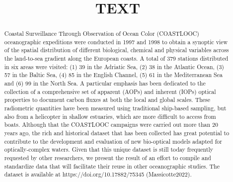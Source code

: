 \documentclass[essd, manuscript]{copernicus}
\begin{document}
\title{TEXT}



\Author[]{}{}
\Author[]{}{}
\Author[]{}{}









\received{}
\pubdiscuss{} %
\revised{}
\accepted{}
\published{}




\maketitle

\begin{abstract}
    Coastal Surveillance Through Observation of Ocean Color (COASTLOOC) oceanographic expeditions were conducted in 1997 and 1998 to obtain a synoptic view of the spatial distribution of different biological, chemical and physical variables across the land-to-sea gradient along the European coasts. A total of 379 stations distributed in six areas were visited: (1) 39 in the Adriatic Sea, (2) 38 in the Atlantic Ocean, (3) 57 in the Baltic Sea, (4) 85 in the English Channel, (5) 61 in the Mediterranean Sea and (6) 99 in the North Sea. A particular emphasis has been dedicated to the collection of a comprehensive set of apparent (AOPs) and inherent (IOPs) optical properties to document carbon fluxes at both the local and global scales. These radiometric quantities have been measured using traditional ship-based sampling, but also from a helicopter in shallow estuaries, which are more difficult to access from boats. Although that the COASTLOOC campaigns were carried out more than 20 years ago, the rich and historical dataset that has been collected has great potential to contribute to the development and evaluation of new bio-optical models adapted for optically-complex waters. Given that this unique dataset is still today frequently requested by other researchers, we present the result of an effort to compile and standardize data that will facilitate their reuse in other oceanographic studies. The dataset is available at https://doi.org/10.17882/75345 (Massicotte2022).
\end{abstract}
\end{document}
